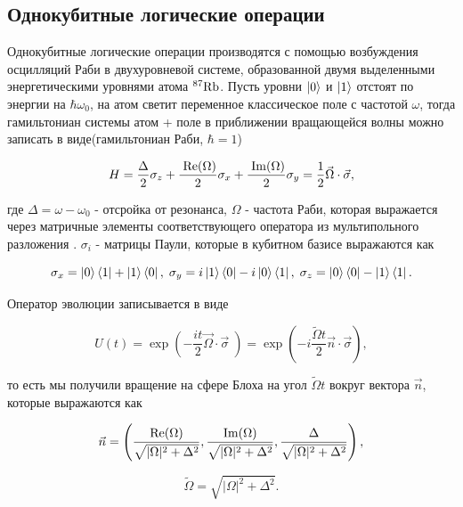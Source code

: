 \subsection{Однокубитные логические операции}

Однокубитные логические операции производятся с помощью возбуждения осцилляций Раби в двухуровневой системе, образованной двумя выделенными энергетическими уровнями атома $^{87}\rm{Rb}$. Пусть уровни $\left| 0 \right\rangle$ и $\left| 1 \right\rangle$ отстоят по энергии на $\hbar \omega_0$, на атом светит переменное классическое поле с частотой $\omega$, тогда гамильтониан системы атом + поле в приближении вращающейся волны можно записать в виде(гамильтониан Раби, $\hbar=1$) \cite{Lukin, Steck}

\begin{equation}
	H = \frac{\Delta}{2} \sigma_z + \frac{\;\rm{Re}(\Omega)}{2}\sigma_x + \frac{\;\rm{Im}(\Omega)}{2}\sigma_y= \frac{1}{2}\vec{\Omega}\cdot\vec{\sigma},
\end{equation}

где $\Delta = \omega - \omega_0$ - отсройка от резонанса, $\Omega$ - частота Раби, которая выражается через матричные элементы соответствующего оператора из мультипольного разложения \cite{LL_teorpol,Steck}. $\sigma_i$ - матрицы Паули, которые в кубитном базисе выражаются как

\begin{equation}
	\sigma_x = \left| 0 \right\rangle\left\langle 1 \right| + \left| 1 \right\rangle\left\langle 0 \right|, \; \sigma_y = i\left| 1 \right\rangle\left\langle 0 \right| - i\left| 0 \right\rangle\left\langle 1 \right|, \; \sigma_z = \left| 0 \right\rangle\left\langle 0 \right|-\left| 1 \right\rangle\left\langle 1 \right|.
\end{equation}

Оператор эволюции записывается в виде 

\begin{equation}
	U(t) = \exp\left(-\frac{it}{2}\vec{\Omega}\cdot\vec{\sigma}\;\right) = \exp\left(-i\frac{\tilde{\Omega}t}{2}\vec{n}\cdot\vec{\sigma}\right),
	\label{eq:evolution_operator}
\end{equation}

то есть мы получили вращение на сфере Блоха на угол $\tilde{\Omega}t$ вокруг вектора $\vec{n}$, которые выражаются как

\begin{equation}
	\vec{n}=\left(\frac{\rm{Re(\Omega)}}{\sqrt{|\Omega|^2 + \Delta^2}},\frac{\rm{Im}(\Omega)}{\sqrt{|\Omega|^2 + \Delta^2}},\frac{\Delta}{\sqrt{|\Omega|^2 + \Delta^2}}\right),
\end{equation}

\begin{equation}
	\tilde{\Omega} = \sqrt{|\Omega|^2 + \Delta^2}.
\end{equation}

